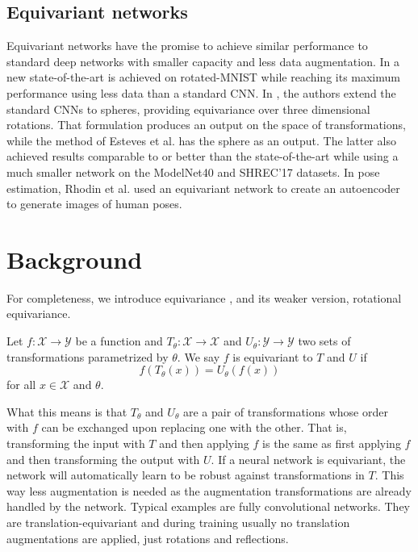 \documentclass[preprint]{elsarticle}
\begin{document}
\subsection{Equivariant networks}
Equivariant networks have the promise to achieve similar performance to standard deep networks with smaller capacity and less data augmentation. In \cite{worrall2016harmonic} a new state-of-the-art is achieved on rotated-MNIST \cite{rotatedMNIST} while reaching its maximum performance using less data than a standard CNN. In \cite{cohen2018spherical}, the authors extend the standard CNNs to spheres, providing equivariance over three dimensional rotations. That formulation produces an output on the space of transformations, while the method of Esteves et al. \cite{esteves2018so3equivariance} has the sphere as an output. The latter also achieved results comparable to or better than the state-of-the-art while using a much smaller network on the ModelNet40 \cite{modelnet40} and SHREC'17 \cite{shrec17} datasets. In pose estimation, Rhodin et al. \cite{helge_geometry-aware} used an equivariant network to create an autoencoder to generate images of human poses.

\section{Background}
For completeness, we introduce equivariance \cite{worall2017interpretable}, and its weaker version, rotational equivariance.
\begin{definition} Let $f:\mathcal{X}\rightarrow\mathcal{Y}$ be a function and $T_{\theta}:\mathcal{X}\rightarrow\mathcal{X}$ and $U_{\theta}:\mathcal{Y}\rightarrow\mathcal{Y}$ two sets of transformations parametrized by $\theta$. We say $f$ is equivariant to $T$ and $U$ if
$$f(T_{\theta}(x))=U_{\theta}(f(x))$$
for all $x\in\mathcal{X}$ and $\theta$.
\end{definition}
What this means is that $T_{\theta}$ and $U_{\theta}$ are a pair of transformations whose order with $f$  can be exchanged upon replacing one with the other.
That is, transforming the input with $T$ and then applying $f$ is the same as first applying $f$ and then transforming the output with $U$. If a neural network is equivariant, the network will automatically learn to be robust against transformations in $T$. This way less augmentation is needed as the augmentation transformations are already handled by the network. Typical examples are fully convolutional networks. They are translation-equivariant and during training usually no translation augmentations are applied, just rotations and reflections.
\end{document}

